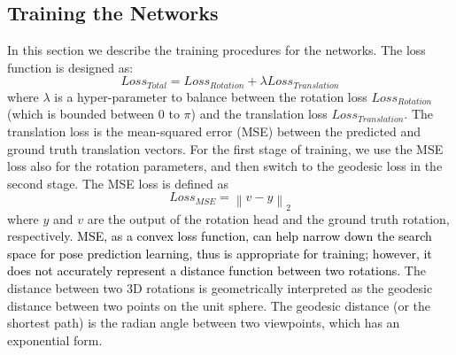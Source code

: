 \documentclass[journal,transmag]{IEEEtran}
\begin{document}
\subsection{Training the Networks}
In this section we describe the training procedures for the networks. The loss function is designed as:
\begin{equation}
    Loss_{Total} = Loss_{Rotation} + \lambda Loss_{Translation}
    \label{eq:total}
\end{equation}
\noindent where $\lambda$ is a hyper-parameter to balance between the rotation loss $Loss_{Rotation}$ (which is bounded between 0 to $\pi$) and the translation loss $Loss_{Translation}$. The translation loss is the mean-squared error (MSE) between the predicted and ground truth translation vectors. For the first stage of training, we use the MSE loss also for the rotation parameters, and then switch to the geodesic loss in the second stage. The MSE loss is defined as
\begin{equation}
    Loss_{MSE} = \left \| v-y \right \|_2
    \label{eq:MSE}
\end{equation}
where $y$ and $v$ are the output of the rotation head and the ground truth rotation, respectively. %
\textcolor{black}{MSE, as a convex loss function, can help narrow down the search space for pose prediction learning, thus is appropriate for training; however, it does not accurately represent a distance function between two rotations.} The distance between two 3D rotations is geometrically interpreted as the geodesic distance between two points on the unit sphere. The geodesic distance (or the shortest path) is the radian angle between two viewpoints, which has an exponential form. %
\end{document}
